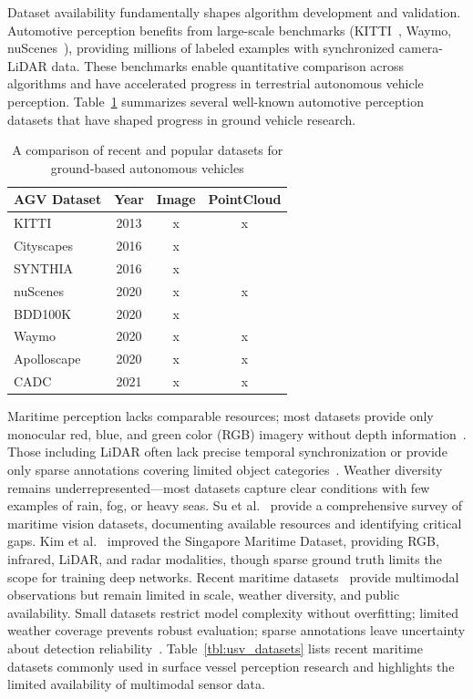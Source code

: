 \documentclass{erauthesis}
\begin{document}
Dataset availability fundamentally shapes algorithm development and validation.
Automotive perception benefits from large-scale benchmarks (KITTI~\cite{geiger2013}, Waymo, nuScenes~\cite{caesar2020}), providing millions of labeled examples with synchronized camera-LiDAR data.
These benchmarks enable quantitative comparison across algorithms and have accelerated progress in terrestrial autonomous vehicle perception.
Table~\ref{tbl:agv_datasets} summarizes several well-known automotive perception datasets that have shaped progress in ground vehicle research.

\begin{table}[t]
\centering
\begin{tabular}{lccc}
\hline
AGV Dataset                          & Year & Image & PointCloud \\
\hline
\hline

KITTI \cite{geiger2013}             & 2013 & x     & x          \\
Cityscapes \cite{cordts2016}        & 2016 & x     &            \\
SYNTHIA \cite{ros2016}              & 2016 & x     &            \\
nuScenes \cite{caesar2020}          & 2020 & x     & x          \\
BDD100K\cite{yu2020}                & 2020 & x     &            \\
Waymo \cite{sun2020}                & 2020 & x     & x          \\
Apolloscape \cite{huang2020}        & 2020 & x     & x          \\
CADC \cite{pitropov2021}            & 2021 & x     & x          \\
\hline
\end{tabular}
\caption{A comparison of recent and popular datasets for ground-based autonomous vehicles}
\label{tbl:agv_datasets}
\end{table}

Maritime perception lacks comparable resources; most datasets provide only monocular red, blue, and green color (RGB) imagery without depth information~\cite{su2023}.
Those including \ac{LiDAR} often lack precise temporal synchronization or provide only sparse annotations covering limited object categories~\cite{su2023}.
Weather diversity remains underrepresented—most datasets capture clear conditions with few examples of rain, fog, or heavy seas.
Su et al.~\cite{su2023} provide a comprehensive survey of maritime vision datasets, documenting available resources and identifying critical gaps.
Kim et al.~\cite{kim2022} improved the Singapore Maritime Dataset, providing RGB, infrared, \ac{LiDAR}, and radar modalities, though sparse ground truth limits the scope for training deep networks.
Recent maritime datasets~\cite{thompson2023} provide multimodal observations but remain limited in scale, weather diversity, and public availability.
Small datasets restrict model complexity without overfitting; limited weather coverage prevents robust evaluation; sparse annotations leave uncertainty about detection reliability~\cite{su2023}.
Table~\ref{tbl:usv_datasets} lists recent maritime datasets commonly used in surface vessel perception research and highlights the limited availability of multimodal sensor data.
\end{document}
